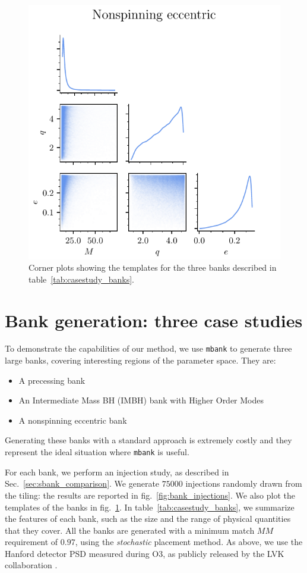 \documentclass[twocolumn,showpacs,preprintnumbers,nofootinbib,prd,
superscriptaddress,10pt]{revtex4-2}
\begin{document}
\begin{figure}[t]
	\includegraphics[scale = 0.7]{bank_scatter_Nonspinning_eccentric}
	\caption{Corner plots showing the templates for the three banks described in table~\ref{tab:casestudy_banks}. }
	\label{fig:bank_scatter}
\end{figure}

\section{Bank generation: three case studies} \label{sec:bank_generation}

To demonstrate the capabilities of our method, we use \texttt{mbank} to generate three large banks, covering interesting regions of the parameter space.
They are:
	\begin{itemize}
		\item A precessing bank
		\item An Intermediate Mass BH (IMBH) bank with Higher Order Modes
		\item A nonspinning eccentric bank
	\end{itemize}
Generating these banks with a standard approach is extremely costly and they represent the ideal situation where \texttt{mbank} is useful.

For each bank, we perform an injection study, as described in Sec.~\ref{sec:sbank_comparison}.
We generate $75000$ injections randomly drawn from the tiling: the results are reported in fig.~\ref{fig:bank_injections}. We also plot the templates of the banks in fig.~\ref{fig:bank_scatter}.
In table~\ref{tab:casestudy_banks}, we summarize the features of each bank, such as the size and the range of physical quantities that they cover.
All the banks are generated with a minimum match $MM$ requirement of $0.97$, using the {\it stochastic} placement method.
As above, we use the Hanford detector PSD measured during O3, as publicly released by the LVK collaboration \cite{O3a_PSDs}.
\end{document}
